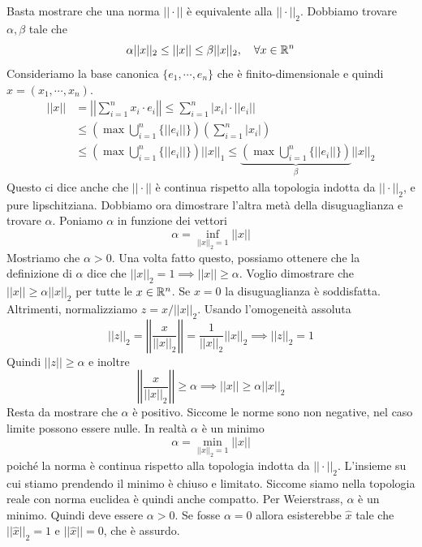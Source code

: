 \documentclass[a4paper]{article}
\begin{document}
\begin{snippetproof}{}
    Basta mostrare che una norma \(||\cdot||\) è equivalente alla \(||\cdot||_2\).
    Dobbiamo trovare \(\alpha,\beta\) tale che
    \[
        \alpha||x||_2 \leq ||x|| \leq \beta||x||_2, \quad \forall x \in \mathbb{R}^n
    \]
    Consideriamo la base canonica \(\{e_1, \cdots, e_n\}\) che è finito-dimensionale
    e quindi \(x = (x_1, \cdots, x_n)\).
    \begin{align*}
        ||x|| &= \left|\left|
            \sum_{i=1}^n x_i \cdot e_i
        \right|\right| \leq \sum_{i=1}^n
        |x_i| \cdot ||e_i|| \\
        &\leq
        \left(\max \bigcup_{i=1}^n \{||e_i||\}\right)
        \left(
            \sum_{i=1}^n |x_i|
        \right) \\
        &\leq \left(\max \bigcup_{i=1}^n \{||e_i||\}\right) ||x||_1
        \leq \underbrace{\left(\max \bigcup_{i=1}^n \{||e_i||\}\right)}_\beta ||x||_2
    \end{align*}
    Questo ci dice anche che \(||\cdot||\) è continua rispetto
    alla topologia indotta da \(||\cdot||_2\), e pure lipschitziana.
    Dobbiamo ora dimostrare l'altra metà della disuguaglianza e trovare \(\alpha\).
    Poniamo \(\alpha\) in funzione dei vettori
    \[
        \alpha = \inf_{||x||_2 = 1} ||x||
    \]
    Mostriamo che \(\alpha>0\).
    Una volta fatto questo, possiamo ottenere che la definizione
    di \(\alpha\) dice che \(||x||_2 = 1 \implies ||x|| \geq \alpha\).
    Voglio dimostrare che \(||x|| \geq \alpha ||x||_2\) per tutte le \(x \in \mathbb{R}^n\).
    Se \(x=0\) la disuguaglianza è soddisfatta. Altrimenti, normalizziamo \(z = x / ||x||_2\).
    Usando l'omogeneità assoluta
    \[
        ||z||_2 = \left|\left|\frac{x}{||x||_2}\right|\right|
        = \frac{1}{||x||_2}||x||_2 \implies ||z||_2 = 1
    \]
    Quindi \(||z|| \geq \alpha\) e inoltre
    \[
        \left|\left|\frac{x}{||x||_2}\right|\right| \geq \alpha \implies
        ||x|| \geq \alpha ||x||_2
    \]
    Resta da mostrare che \(\alpha\) è positivo.
    Siccome le norme sono non negative, nel caso limite possono essere nulle.
    In realtà \(\alpha\) è un minimo
    \[
        \alpha = \min_{||x||_2 = 1} ||x||
    \]
    poiché la norma è continua rispetto alla topologia indotta da \(||\cdot||_2\).
    L'insieme su cui stiamo prendendo il minimo è chiuso e limitato.
    Siccome siamo nella topologia reale con norma euclidea è quindi anche compatto.
    Per Weierstrass, \(\alpha\) è un minimo.
    Quindi deve essere \(\alpha > 0\). Se fosse \(\alpha = 0\)
    allora esisterebbe \(\hat{x}\) tale che \(||\hat{x}||_2 = 1\) e \(||\hat{x}|| = 0\), che è assurdo.
\end{snippetproof}
\end{document}
